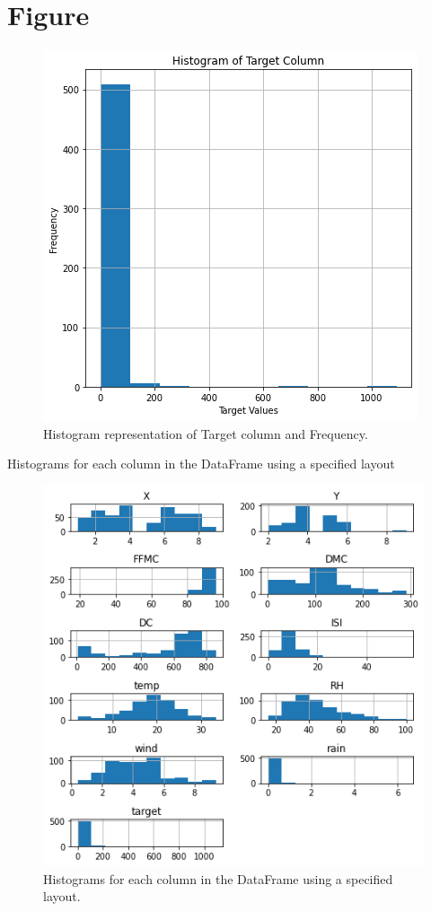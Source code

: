 \clearpage
\section{Figure}
\begin{figure}[ht]
    \centering
    \includegraphics[scale=1.0]{figures/output_14_0.png}
    \caption{Histogram representation of Target column and Frequency.}
    \label{fig:example-01}
\end{figure}
\clearpage
Histograms for each column in the DataFrame using a specified layout
\begin{figure}[ht]
    \centering
    \includegraphics[scale=1.0]{figures/output_16_1.png}
    \caption{Histograms for each column in the DataFrame using a specified layout.}
    \label{fig:example-01}
\end{figure}

